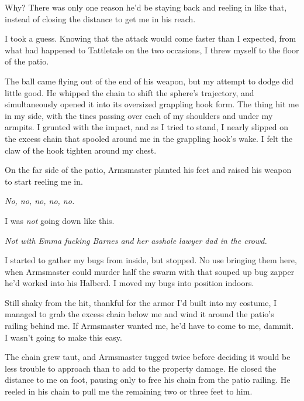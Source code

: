 Why?  There was only one reason he'd be staying back and reeling in like that, instead of closing the distance to get me in his reach.



I took a guess.  Knowing that the attack would come faster than I expected, from what had happened to Tattletale on the two occasions, I threw myself to the floor of the patio.



The ball came flying out of the end of his weapon, but my attempt to dodge did little good.  He whipped the chain to shift the sphere's trajectory, and simultaneously opened it into its oversized grappling hook form.  The thing hit me in my side, with the tines passing over each of my shoulders and under my armpits.  I grunted with the impact, and as I tried to stand, I nearly slipped on the excess chain that spooled around me in the grappling hook's wake.  I felt the claw of the hook tighten around my chest.



On the far side of the patio, Armsmaster planted his feet and raised his weapon to start reeling me in.



\emph{No, no, no, no, no.}



I was \emph{not} going down like this.



\emph{Not with Emma fucking Barnes and her asshole lawyer dad in the crowd.}



I started to gather my bugs from inside, but stopped.  No use bringing them here, when Armsmaster could murder half the swarm with that souped up bug zapper he'd worked into his Halberd.  I moved my bugs into position indoors.



Still shaky from the hit, thankful for the armor I'd built into my costume, I managed to grab the excess chain below me and wind it around the patio's railing behind me.  If Armsmaster wanted me, he'd have to come to me, dammit.  I wasn't going to make this easy.



The chain grew taut, and Armsmaster tugged twice before deciding it would be less trouble to approach than to add to the property damage.  He closed the distance to me on foot, pausing only to free his chain from the patio railing.  He reeled in his chain to pull me the remaining two or three feet to him.



